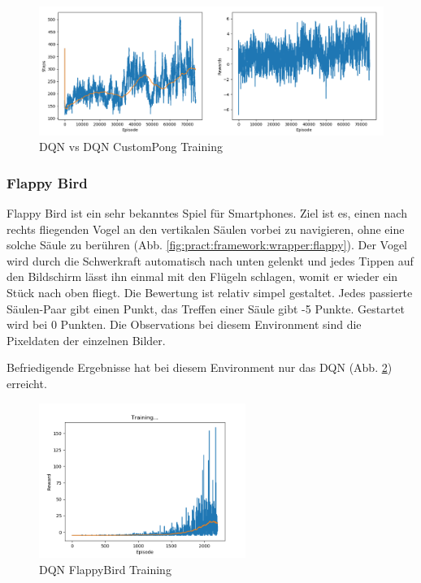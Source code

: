 \documentclass[12pt,a4paper]{article}
\begin{document}
\begin{figure}[!h]
	\centering
	\includegraphics[width=1\textwidth]{gfx/dqn_custompong_model_70000}
	\caption{DQN vs DQN CustomPong Training}
	\label{fig:pract:pong:dqn_vs_dqn}
\end{figure}

\newpage

\subsubsection{Flappy Bird}
Flappy Bird ist ein sehr bekanntes Spiel für Smartphones.
Ziel ist es, einen nach rechts fliegenden Vogel an den vertikalen Säulen vorbei zu navigieren, ohne eine solche Säule zu berühren (Abb. \ref{fig:pract:framework:wrapper:flappy}).
Der Vogel wird durch die Schwerkraft automatisch nach unten gelenkt und jedes Tippen auf den Bildschirm lässt ihn einmal mit den Flügeln schlagen, womit er wieder ein Stück nach oben fliegt.
Die Bewertung ist relativ simpel gestaltet.
Jedes passierte Säulen-Paar gibt einen Punkt, das Treffen einer Säule gibt -5 Punkte.
Gestartet wird bei 0 Punkten.
Die Observations bei diesem Environment sind die Pixeldaten der einzelnen Bilder.

Befriedigende Ergebnisse hat bei diesem Environment nur das DQN (Abb. \ref{fig:pract:flappy:dqn}) erreicht.

\begin{figure}[!h]
	\centering
	\includegraphics[width=0.6\textwidth]{gfx/dqn_flappybird_model_2200}
	\caption{DQN FlappyBird Training}
	\label{fig:pract:flappy:dqn}
\end{figure}
\end{document}
